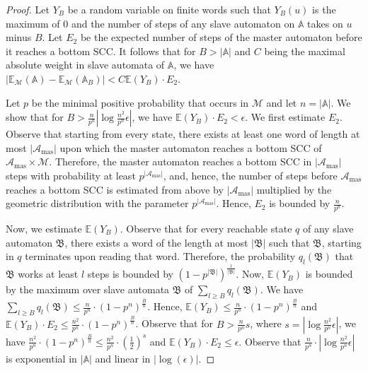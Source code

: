 \documentclass{lmcs}
\newcommand{\masterA}{\mathcal{A}_{\textrm{mas}}}
\newcommand{\nestedA}{\mathbb{A}}
\newcommand{\slaveA}{{\mathfrak{B}}}
\newcommand{\expected}{\mathbb{E}}
\newcommand{\markov}{\mathcal{M}}
\begin{document}
\begin{proof}
Let $Y_B$ be a random variable on finite words such that $Y_B(u)$ is the maximum of $0$ and the number of steps of any slave automaton on $\nestedA$ takes on $u$
minus $B$. Let $E_2$ be the expected number of steps of the master automaton before it reaches a bottom SCC\@.
It follows that for $B > |\nestedA|$ and $C$ being the maximal absolute weight in slave automata of $\nestedA$, we have
$|\expected_{\markov}(\nestedA) - \expected_{\markov}(\nestedA_B)| < C \expected(Y_B) \cdot E_2$.

Let $p$ be the minimal positive probability that occurs in $\markov$ and let $n = |\nestedA|$.
We show that for $B > \frac{n}{p^n} |\log \frac{n^2}{p^n} \epsilon|$,
 we have $\expected(Y_B) \cdot E_2 < \epsilon$. We first estimate $E_2$.
Observe that starting from every state, there exists at least one word of length at most $|\masterA|$ upon which
the master automaton reaches a bottom SCC of $\masterA \times \markov$.
Therefore, the master automaton reaches a bottom SCC  in $|\masterA|$ steps with probability at least $p^{|\masterA|}$, and, hence,
the number of steps before $\masterA$ reaches a bottom SCC is estimated from above by
$|\masterA|$ multiplied by the geometric distribution with the parameter $p^{|\masterA|}$.
Hence, $E_2$ is bounded by $\frac{n}{p^{n}}$.

Now, we estimate $\expected(Y_B)$.
Observe that for every reachable state $q$ of any slave automaton $\slaveA$, there exists a word
of the length at most $|\slaveA|$ such that $\slaveA$, starting in $q$ terminates upon reading that word.
Therefore, the probability $q_l(\slaveA)$ that $\slaveA$ works at least $l$ steps is bounded by ${(1-p^{|\slaveA|})}^{\frac{l}{|\slaveA|}}$.
Now, $\expected(Y_B) $ is bounded by the maximum over slave automata $\slaveA$ of $\sum_{l \geq B} q_l(\slaveA)$.
We have $\sum_{l \geq B} q_l(\slaveA) \leq  \frac{n}{p^n} \cdot {(1-p^n)}^{\frac{B}{n}}$.
Hence, $\expected(Y_B) \leq \frac{n}{p^n} \cdot {(1-p^n)}^{\frac{B}{n}}$ and
$\expected(Y_B) \cdot E_2 \leq \frac{n^2}{p^n} \cdot {(1-p^n)}^{\frac{B}{n}}$.
Observe that for $B > \frac{n}{p^n} s$, where $s  = |\log \frac{n^2}{p^n} \epsilon|$,
we have $\frac{n^2}{p^n} \cdot {(1-p^n)}^{\frac{B}{n}} \leq  \frac{n^2}{p^n} \cdot {(\frac{1}{2})}^s$ and
 $\expected(Y_B) \cdot E_2 \leq \epsilon$.
Observe that $\frac{n}{p^n} \cdot |\log \frac{n^2}{p^n} \epsilon|$ is exponential in $|\nestedA|$ and
linear in $|\log(\epsilon)|$.
\smallskip


\end{proof}
\end{document}
